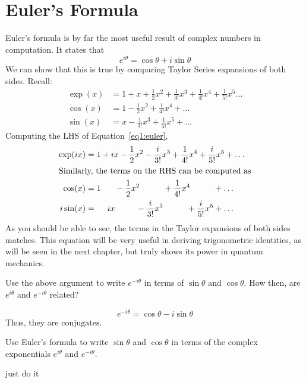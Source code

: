 \section{Euler's Formula}
Euler's formula is by far the most useful result of complex numbers in computation. It states that
\begin{equation}
	e^{i\theta} = \cos\theta + i\sin\theta \label{eq1:euler}
\end{equation}
We can show that this is true by comparing Taylor Series expansions of both sides. Recall:
\begin{align*}
	\exp(x) &= 1 + x + \frac{1}{2}x^2 + \frac{1}{3!} x^3+\frac{1}{4!}x^4+\frac{1}{5!}x^5\dots\\
	\cos(x) &= 1 - \frac{1}{2}x^2 + \frac{1}{4!}x^4+\dots\\
	\sin(x) &= x - \frac{1}{3!}x^3+\frac{1}{5!}x^5+\dots
\end{align*}
Computing the LHS of Equation~\ref{eq1:euler},
\begin{align*}
	\exp(ix) &= 1 + ix -\frac{1}{2}x^2 - \frac{i}{3!} x^3 + \frac{1}{4!}x^4 + \frac{i}{5!}x^5+\dots\\
	\intertext{Similarly, the terms on the RHS can be computed as}
	\cos(x)&=1\hphantom{+ix}-\frac{1}{2}x^2\hphantom{-\frac{i}{3!}x^3}+\frac{1}{4!}x^4\hphantom{+\frac{i}{5!}x^5}+\dots\\
	i\sin(x)&=\hphantom{1+}ix\hphantom{-\frac{1}{2}x^2}-\frac{i}{3!}x^3\hphantom{+\frac{1}{4!}x^4}+\frac{i}{5!}x^5+\dots
\end{align*}
As you should be able to see, the terms in the Taylor expansions of both sides matches. This equation will be very useful in deriving trigonometric identities, as will be seen in the next chapter, but truly shows its power in quantum mechanics.
\begin{exercise}
	Use the above argument to write \(e^{-i\theta}\) in terms of \(\sin\theta\) and \(\cos\theta\). How then, are \(e^{i\theta}\) and \(e^{-i\theta}\) related?
\begin{solution}
	\[e^{-i\theta} = \boxed{\cos\theta-i\sin\theta}\]
	Thus, they are \(\boxed{\text{conjugates}}\).
\end{solution}
\end{exercise}
\begin{exercise}
	Use Euler's formula to write \(\sin\theta\) and \(\cos\theta\) in terms of the complex exponentials \(e^{i\theta}\) and \(e^{-i\theta}\).
	\begin{solution}
		just do it
	\end{solution}
\end{exercise}


